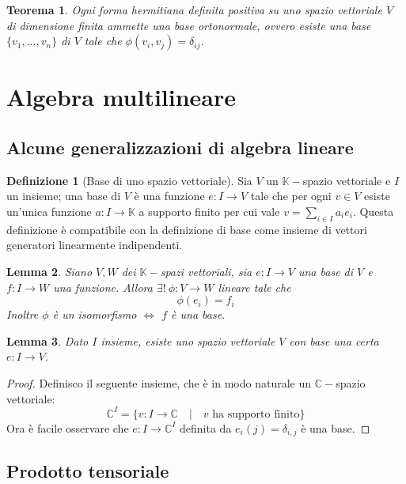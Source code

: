 \documentclass[11pt]{article}
\theoremstyle{plain}
\newtheorem{thm}{Teorema}[section]
\newtheorem{lemma}[thm]{Lemma}
\theoremstyle{definition}
\newtheorem{defn}{Definizione}[section]
\theoremstyle{remark}
\newcommand{\C}{\mathbb{C}}
\newcommand{\K}{\mathbb{K}}
\begin{document}
\begin{thm}
	Ogni forma hermitiana definita positiva su uno spazio vettoriale $V$ di dimensione finita ammette una \textit{base ortonormale}, ovvero esiste una base $\{v_1,\ldots,v_n\}$ di $V$ tale che $\phi(v_i,v_j)=\delta_{ij}$. 
\end{thm}




\newpage
\section{Algebra multilineare}
\subsection{Alcune generalizzazioni di algebra lineare}

\begin{defn}[Base di uno spazio vettoriale]
Sia $V$ un $\K-$spazio vettoriale e $I$ un insieme; una base di $V$ è una funzione $e: I \to V$ tale che 
per ogni $v \in V$ esiste un'unica funzione $a: I \to \K$ a supporto finito per cui vale $v=\sum_{i\in I}a_i e_i$.
Questa definizione è compatibile con la definizione di base come insieme di vettori generatori linearmente indipendenti.
\end{defn}


\begin{lemma}
Siano $V,W$ dei $\K-$spazi vettoriali, sia $e:I\to V$ una base di $V$ e $f: I \to W$ una funzione. Allora $\exists!\  \phi: V \to W$ lineare tale che
\[\phi(e_i) = f_i \]
Inoltre $\phi$ è un isomorfismo $\Leftrightarrow$ $f$ è una base.
\end{lemma}

\begin{lemma}
Dato $I$ insieme, esiste uno spazio vettoriale $V$ con base una certa $e:I\to V$.
\end{lemma}
\begin{proof}
Definisco il seguente insieme, che è in modo naturale un $\C-$spazio vettoriale:
\[ \C^I = \{ v:I\to\C \quad|\quad v \text{ ha supporto finito}\}\]
Ora è facile osservare che $e:I\to\C^I$ definita da $e_i(j) = \delta_{i,j}$ è una base.
\end{proof}


\subsection{Prodotto tensoriale}
\end{document}

